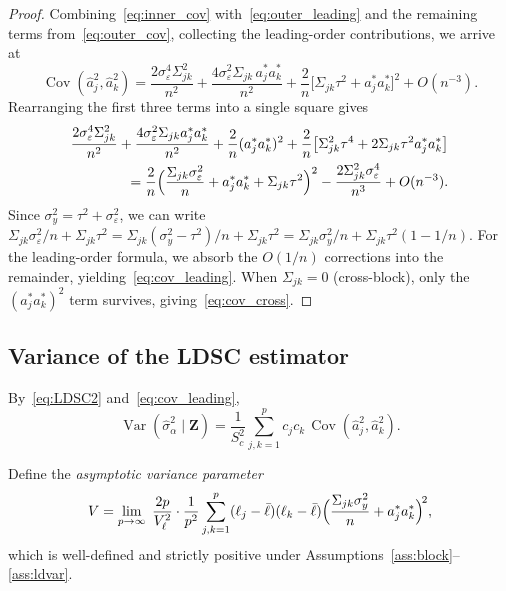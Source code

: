 \documentclass[11pt]{article}
\newcommand{\Var}{\operatorname{Var}}
\newcommand{\Cov}{\operatorname{Cov}}
\newcommand{\Z}{\bm{Z}}
\begin{document}
\begin{proof}
\medskip
Combining~\eqref{eq:inner_cov} with~\eqref{eq:outer_leading} and the
remaining terms from~\eqref{eq:outer_cov}, collecting the leading-order
contributions, we arrive at
\begin{equation}\label{eq:cov_full}
  \Cov(\hat{a}_j^{2},\hat{a}_k^{2})
  = \frac{2\sigma_\varepsilon^{4}\Sigma_{jk}^{2}}{n^{2}}
    + \frac{4\sigma_\varepsilon^{2}\Sigma_{jk}\,a_j^{*}a_k^{*}}{n^{2}}
    + \frac{2}{n}\bigl[\Sigma_{jk}\tau^{2}+a_j^{*}a_k^{*}\bigr]^{2}
    + O(n^{-3}).
\end{equation}
Rearranging the first three terms into a single square gives
\begin{align}
  \frac{2\sigma_\varepsilon^{4}\Sigma_{jk}^{2}}{n^{2}}
  + \frac{4\sigma_\varepsilon^{2}\Sigma_{jk}a_j^{*}a_k^{*}}{n^{2}}
  + \frac{2}{n}(a_j^{*}a_k^{*})^{2}
  + \frac{2}{n}\bigl[\Sigma_{jk}^{2}\tau^{4}+2\Sigma_{jk}\tau^{2}a_j^{*}a_k^{*}\bigr]
  \notag\\
  = \frac{2}{n}\Bigl(\frac{\Sigma_{jk}\sigma_\varepsilon^{2}}{n}
    + a_j^{*}a_k^{*}+\Sigma_{jk}\tau^{2}\Bigr)^{2}
  - \frac{2\Sigma_{jk}^{2}\sigma_\varepsilon^{4}}{n^{3}}
  + O(n^{-3}).
  \label{eq:rearrange}
\end{align}
Since $\sigma_y^{2}=\tau^{2}+\sigma_\varepsilon^{2}$, we can write
$\Sigma_{jk}\sigma_\varepsilon^{2}/n+\Sigma_{jk}\tau^{2}
=\Sigma_{jk}(\sigma_y^{2}-\tau^{2})/n+\Sigma_{jk}\tau^{2}
=\Sigma_{jk}\sigma_y^{2}/n+\Sigma_{jk}\tau^{2}(1-1/n)$.  For the leading-order
formula, we absorb the $O(1/n)$ corrections into the remainder, yielding~\eqref{eq:cov_leading}.  When $\Sigma_{jk}=0$ (cross-block), only the
$(a_j^{*}a_k^{*})^{2}$ term survives, giving~\eqref{eq:cov_cross}.
\end{proof}

\subsection{Variance of the LDSC estimator}

By~\eqref{eq:LDSC2} and~\eqref{eq:cov_leading},
\begin{equation}\label{eq:var_hat_sigma}
  \Var(\hat\sigma_\alpha^{2}\mid\Z)
  = \frac{1}{S_c^{2}}\sum_{j,k=1}^{p}c_jc_k\,\Cov(\hat{a}_j^{2},\hat{a}_k^{2}).
\end{equation}

Define the \emph{asymptotic variance parameter}
\begin{equation}\label{eq:Vdef}
  V = \lim_{p\to\infty}\;
  \frac{2p}{V_\ell^{2}}\cdot\frac{1}{p^{2}}
  \sum_{j,k=1}^{p}
    (\ell_j-\bar\ell)(\ell_k-\bar\ell)
    \Bigl(\frac{\Sigma_{jk}\sigma_y^{2}}{n}+a_j^{*}a_k^{*}\Bigr)^{\!2},
\end{equation}
which is well-defined and strictly positive under
Assumptions~\ref{ass:block}--\ref{ass:ldvar}.
\end{document}
